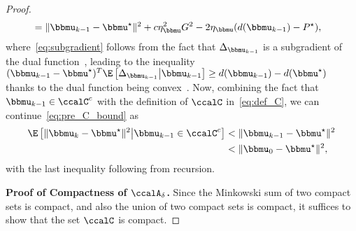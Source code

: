\begin{proof}
\begin{align}
&= \|\bbmu_{k-1} - \bbmu^{\star}  \|^2 + c \eta_{\bbmu}^2 G^2 - 2\eta_{\bbmu} (d(\bbmu_{k-1}) - P^{\star}),\label{eq:pre_C_bound}
\end{align}
where~\eqref{eq:subgradient} follows from the fact that $\Delta_{\bbmu_{k-1}}$ is a subgradient of the dual function~\cite{danskin2012theory}, leading to the inequality $(\bbmu_{k-1} - \bbmu^{\star})^T \E\left[\Delta_{\bbmu_{k-1}}\middle| \bbmu_{k-1}\right] \geq d(\bbmu_{k-1}) - d(\bbmu^{\star})$ thanks to the dual function being convex~\cite{boyd2004convex}. Now, combining the fact that $\bbmu_{k-1}\in\ccalC^c$ with the definition of $\ccalC$ in~\eqref{eq:def_C}, we can continue~\eqref{eq:pre_C_bound} as
\begin{align}
\E\left[\|\bbmu_{k} - \bbmu^{\star}\|^2 \middle| \bbmu_{k-1}\in\ccalC^c\right]
&< \|\bbmu_{k-1} - \bbmu^{\star}\|^2 \\
&< \|\bbmu_{0} - \bbmu^{\star}\|^2,
\end{align}
with the last inequality following from recursion.


\noindent\textbf{Proof of Compactness of $\ccalA_{\delta}$.} Since the Minkowski sum of two compact sets is compact, and also the union of two compact sets is compact, it suffices to show that the set $\ccalC$ is compact.


\end{proof}
